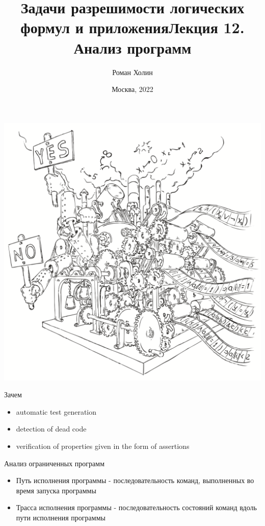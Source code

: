 \documentclass{beamer}
\begin{document}
\title{Задачи разрешимости логических формул и приложения\newline Лекция 12. Анализ программ}
\author{Роман Холин}
\date{Москва, 2022}

\begin{frame}
\includegraphics[scale=0.5]{../decision-procedure.png}
\end{frame}

\frame{\titlepage}

\begin{frame}{Зачем}
\begin{itemize}
\item automatic test generation
\item detection of dead code
\item verification of properties given in the form of assertions
\end{itemize}
\end{frame}

\begin{frame}{Анализ ограниченных программ}
\begin{itemize}
\item Путь исполнения программы - последовательность команд, выполненных во время запуска программы
\item Трасса исполнения программы - последовательность состояний команд вдоль пути исполнения программы
\end{itemize}
\end{frame}
\end{document}
